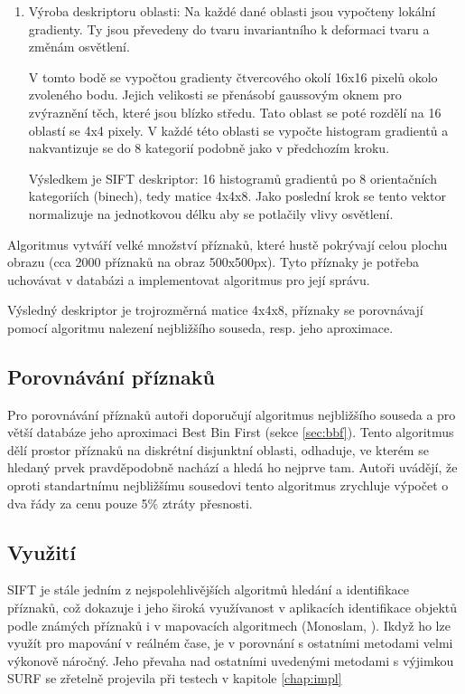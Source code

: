 \begin{enumerate}
		\item Výroba deskriptoru oblasti: Na každé dané oblasti jsou vypočteny lokální gradienty. Ty jsou převedeny do tvaru invariantního k deformaci tvaru a změnám osvětlení.
		
			V tomto bodě se vypočtou gradienty čtvercového okolí 16x16 pixelů okolo zvoleného bodu. Jejich velikosti se přenásobí gaussovým oknem pro zvýraznění těch, které jsou blízko středu. Tato oblast se poté rozdělí na 16 oblastí se 4x4 pixely. V každé této oblasti se vypočte histogram gradientů a nakvantizuje se do 8 kategorií podobně jako v předchozím kroku.
			
			Výsledkem je SIFT deskriptor: 16 histogramů gradientů po 8 orientačních kategoriích (binech), tedy matice 4x4x8. Jako poslední krok se tento vektor normalizuje na jednotkovou délku aby se potlačily vlivy osvětlení. 
			
			
	\end{enumerate}
	
	Algoritmus vytváří velké množství příznaků, které hustě pokrývají celou plochu obrazu (cca 2000 příznaků na obraz 500x500px). Tyto příznaky je potřeba uchovávat v databázi a implementovat algoritmus pro její správu.
	
	Výsledný deskriptor je trojrozměrná matice 4x4x8, příznaky se porovnávají pomocí algoritmu nalezení nejbližšího souseda, resp. jeho aproximace.
	
	\subsection{Porovnávání příznaků}
	
	Pro porovnávání příznaků autoři doporučují algoritmus nejbližšího souseda a pro větší databáze jeho aproximaci Best Bin First (sekce \ref{sec:bbf}). Tento algoritmus dělí prostor příznaků na diskrétní disjunktní oblasti, odhaduje, ve kterém se hledaný prvek pravděpodobně nachází a hledá ho nejprve tam. Autoři uvádějí, že oproti standartnímu nejbližšímu sousedovi tento algoritmus zrychluje výpočet o dva řády za cenu pouze 5\% ztráty přesnosti.
	
	\subsection{Využití}
	
	SIFT je stále jedním z nejspolehlivějších algoritmů hledání a identifikace příznaků, což dokazuje i jeho široká využívanost v aplikacích identifikace objektů podle známých příznaků i v mapovacích algoritmech (Monoslam, \cite{slam_monoslam} ). Ikdyž ho lze využít pro mapování v reálném čase, je v porovnání s ostatními metodami velmi výkonově náročný. Jeho převaha nad ostatními uvedenými metodami s výjimkou SURF se zřetelně projevila při testech v kapitole \ref{chap:impl}


